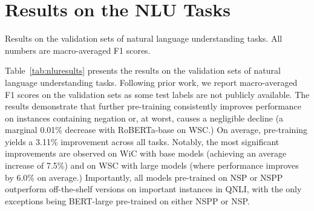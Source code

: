 \section{Results on the NLU Tasks}
\label{app:nluresults}

\begin{table*}
    \centering
    
    \caption{
        Results on the validation sets of natural language understanding tasks.
        All numbers are macro-averaged F1 scores.
        \label{tab:nluresults}
        }
\end{table*}

Table~\ref{tab:nluresults} presents the results on the validation sets of natural language understanding tasks. 
Following prior work, we report macro-averaged F1 scores on the validation sets as some test labels are not publicly available. 
The results demonstrate that further pre-training consistently improves performance on instances containing negation or, at worst, causes a negligible decline 
(a marginal 0.01\% decrease with {RoBERTa-base} on WSC.)
On average, pre-training yields a 3.11\% improvement across all tasks.
Notably, the most significant improvements are observed on WiC with base models
(achieving an average increase of 7.5\%) and on WSC with large models (where performance improves by 6.0\% on average.) 
Importantly, all models pre-trained on NSP or NSPP outperform off-the-shelf versions on important instances in QNLI, 
with the only exceptions being {BERT-large} pre-trained on either NSPP or NSP. 
